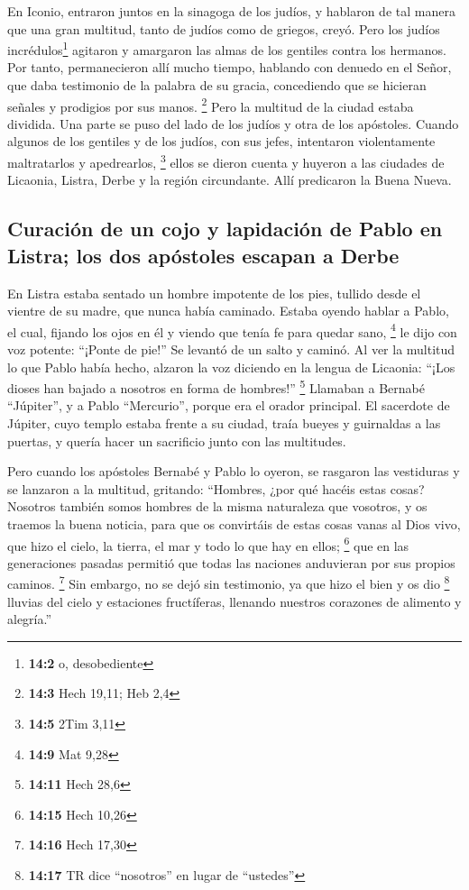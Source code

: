  En Iconio, entraron juntos en la sinagoga de los judíos,
y hablaron de tal manera que una gran multitud, tanto de judíos como de
griegos, creyó.  Pero los judíos incrédulos\footnote{\textbf{14:2}
  o, desobediente} agitaron y amargaron las almas de los gentiles contra
los hermanos.  Por tanto, permanecieron allí mucho tiempo,
hablando con denuedo en el Señor, que daba testimonio de la palabra de
su gracia, concediendo que se hicieran señales y prodigios por sus
manos. \footnote{\textbf{14:3} Hech 19,11; Heb 2,4}  Pero
la multitud de la ciudad estaba dividida. Una parte se puso del lado de
los judíos y otra de los apóstoles.  Cuando algunos de los
gentiles y de los judíos, con sus jefes, intentaron violentamente
maltratarlos y apedrearlos, \footnote{\textbf{14:5} 2Tim 3,11}
 ellos se dieron cuenta y huyeron a las ciudades de
Licaonia, Listra, Derbe y la región circundante.  Allí
predicaron la Buena Nueva.

\hypertarget{curaciuxf3n-de-un-cojo-y-lapidaciuxf3n-de-pablo-en-listra-los-dos-apuxf3stoles-escapan-a-derbe}{%
\subsection{Curación de un cojo y lapidación de Pablo en Listra; los dos
apóstoles escapan a
Derbe}\label{curaciuxf3n-de-un-cojo-y-lapidaciuxf3n-de-pablo-en-listra-los-dos-apuxf3stoles-escapan-a-derbe}}

 En Listra estaba sentado un hombre impotente de los pies,
tullido desde el vientre de su madre, que nunca había caminado.
 Estaba oyendo hablar a Pablo, el cual, fijando los ojos
en él y viendo que tenía fe para quedar sano, \footnote{\textbf{14:9}
  Mat 9,28}  le dijo con voz potente: ``¡Ponte de pie!''
Se levantó de un salto y caminó.  Al ver la multitud lo
que Pablo había hecho, alzaron la voz diciendo en la lengua de Licaonia:
``¡Los dioses han bajado a nosotros en forma de hombres!'' \footnote{\textbf{14:11}
  Hech 28,6}  Llamaban a Bernabé ``Júpiter'', y a Pablo
``Mercurio'', porque era el orador principal.  El
sacerdote de Júpiter, cuyo templo estaba frente a su ciudad, traía
bueyes y guirnaldas a las puertas, y quería hacer un sacrificio junto
con las multitudes.

 Pero cuando los apóstoles Bernabé y Pablo lo oyeron, se
rasgaron las vestiduras y se lanzaron a la multitud, gritando:
 ``Hombres, ¿por qué hacéis estas cosas? Nosotros también
somos hombres de la misma naturaleza que vosotros, y os traemos la buena
noticia, para que os convirtáis de estas cosas vanas al Dios vivo, que
hizo el cielo, la tierra, el mar y todo lo que hay en ellos; \footnote{\textbf{14:15}
  Hech 10,26}  que en las generaciones pasadas permitió
que todas las naciones anduvieran por sus propios caminos. \footnote{\textbf{14:16}
  Hech 17,30}  Sin embargo, no se dejó sin testimonio, ya
que hizo el bien y os dio \footnote{\textbf{14:17} TR dice ``nosotros''
  en lugar de ``ustedes''} lluvias del cielo y estaciones fructíferas,
llenando nuestros corazones de alimento y alegría.''

